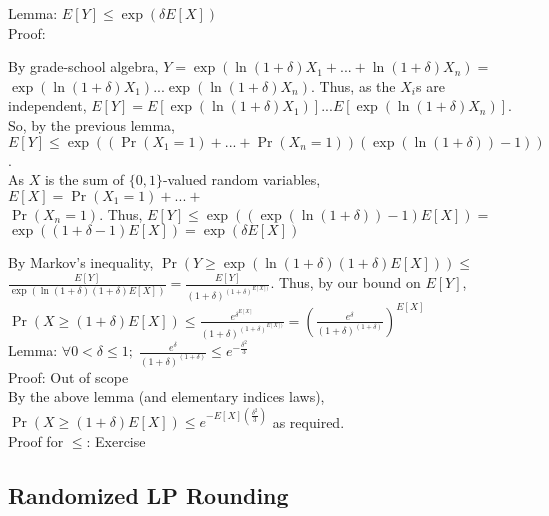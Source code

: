 \documentclass[20pt,a4paper,landscape]{extarticle}
\begin{document}
\begin{flushleft}
\begin{adjustwidth}{1em}{}
\end{adjustwidth}
Lemma: $E[Y] \leq \exp(\delta E[X])$\\
Proof:
\begin{adjustwidth}{1em}{}
By grade-school algebra, $Y = \exp(\ln(1+\delta)X_1+...+\ln(1+\delta)X_n) =$\\
$\exp(\ln(1+\delta)X_1)...\exp(\ln(1+\delta)X_n)$. Thus, as the $X_i$s are independent, $E[Y] = E[\exp(\ln(1+\delta)X_1)]...E[\exp(\ln(1+\delta)X_n)]$. So, by the previous lemma, $E[Y] \leq \exp((\Pr(X_1=1)+...+\Pr(X_n=1))(\exp(\ln(1+\delta))-1))$.\\
As $X$ is the sum of $\{0, 1\}$-valued random variables, $E[X] = \Pr(X_1=1)+...+$\\
$\Pr(X_n=1)$. Thus, $E[Y] \leq \exp((\exp(\ln(1+\delta))-1)E[X]) =$\\
$\exp((1+\delta-1)E[X]) = \exp(\delta E[X])$\\
\end{adjustwidth}
By Markov's inequality, $\Pr(Y \geq \exp(\ln(1+\delta)(1+\delta)E[X])) \leq$\\
$\frac{E[Y]}{\exp(\ln(1+\delta)(1+\delta)E[X])} = \frac{E[Y]}{(1+\delta)^{(1+\delta)^{E[X])}}}$. Thus, by our bound on $E[Y]$, $\Pr(X \geq (1+\delta)E[X]) \leq \frac{e^{\delta^{E[X]}}}{(1+\delta)^{(1+\delta)^{E[X])}}} = \left(\frac{e^\delta}{(1+\delta)^{(1+\delta)}}\right)^{E[X]}$\\
Lemma: $\forall 0 < \delta \leq 1; \; \frac{e^\delta}{(1+\delta)^{(1+\delta)}} \leq e^{-\frac{\delta^2}{3}}$\\
Proof: Out of scope\\
By the above lemma (and elementary indices laws), $\Pr(X \geq (1+\delta)E[X]) \leq e^{-E[X]\left(\frac{\delta^2}{3}\right)}$ as required.\\
Proof for $\leq$: Exercise
\subsection{Randomized LP Rounding}

\end{flushleft}
\end{document}
